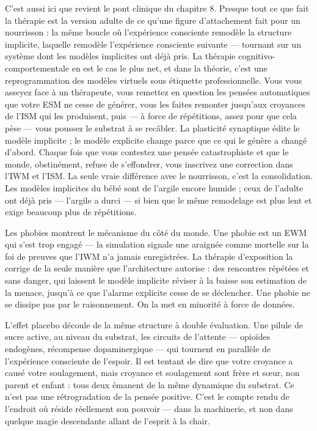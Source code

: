 \documentclass[11pt, twoside, openright]{book}
\begin{document}
C'est aussi ici que revient le pont clinique du chapitre 8. Presque tout ce que fait la thérapie est la version adulte de ce qu'une figure d'attachement fait pour un nourrisson : la même boucle où l'expérience consciente remodèle la structure implicite, laquelle remodèle l'expérience consciente suivante --- tournant sur un système dont les modèles implicites ont déjà pris. La thérapie cognitivo-comportementale en est le cas le plus net, et dans la théorie, c'est une reprogrammation des modèles virtuels sous étiquette professionnelle. Vous vous asseyez face à un thérapeute, vous remettez en question les pensées automatiques que votre ESM ne cesse de générer, vous les faites remonter jusqu'aux croyances de l'ISM qui les produisent, puis --- à force de répétitions, assez pour que cela pèse --- vous poussez le substrat à se recâbler. La plasticité synaptique édite le modèle implicite ; le modèle explicite change parce que ce qui le génère a changé d'abord. Chaque fois que vous contestez une pensée catastrophiste et que le monde, obstinément, refuse de s'effondrer, vous inscrivez une correction dans l'IWM et l'ISM. La seule vraie différence avec le nourrisson, c'est la consolidation. Les modèles implicites du bébé sont de l'argile encore humide ; ceux de l'adulte ont déjà pris --- l'argile a durci --- si bien que le même remodelage est plus lent et exige beaucoup plus de répétitions.

Les phobies montrent le mécanisme du côté du monde. Une phobie est un EWM qui s'est trop engagé --- la simulation signale une araignée comme mortelle sur la foi de preuves que l'IWM n'a jamais enregistrées. La thérapie d'exposition la corrige de la seule manière que l'architecture autorise : des rencontres répétées et sans danger, qui laissent le modèle implicite réviser à la baisse son estimation de la menace, jusqu'à ce que l'alarme explicite cesse de se déclencher. Une phobie ne se dissipe pas par le raisonnement. On la met en minorité à force de données.

L'effet placebo découle de la même structure à double évaluation. Une pilule de sucre active, au niveau du substrat, les circuits de l'attente --- opioïdes endogènes, récompense dopaminergique --- qui tournent en parallèle de l'expérience consciente de l'espoir. Il est tentant de dire que votre croyance a causé votre soulagement, mais croyance et soulagement sont frère et sœur, non parent et enfant : tous deux émanent de la même dynamique du substrat. Ce n'est pas une rétrogradation de la pensée positive. C'est le compte rendu de l'endroit où réside réellement son pouvoir --- dans la machinerie, et non dans quelque magie descendante allant de l'esprit à la chair.
\end{document}
